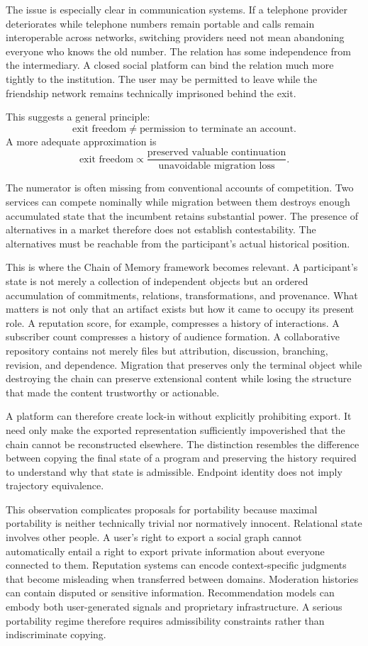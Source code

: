 \documentclass[11pt]{article}
\begin{document}
The issue is especially clear in communication systems. If a telephone provider deteriorates while telephone numbers remain portable and calls remain interoperable across networks, switching providers need not mean abandoning everyone who knows the old number. The relation has some independence from the intermediary. A closed social platform can bind the relation much more tightly to the institution. The user may be permitted to leave while the friendship network remains technically imprisoned behind the exit.

This suggests a general principle:
\[
\text{exit freedom}
\neq
\text{permission to terminate an account}.
\]
A more adequate approximation is
\[
\text{exit freedom}
\propto
\frac{\text{preserved valuable continuation}}
{\text{unavoidable migration loss}}.
\]

The numerator is often missing from conventional accounts of competition. Two services can compete nominally while migration between them destroys enough accumulated state that the incumbent retains substantial power. The presence of alternatives in a market therefore does not establish contestability. The alternatives must be reachable from the participant's actual historical position.

This is where the Chain of Memory framework becomes relevant. A participant's state is not merely a collection of independent objects but an ordered accumulation of commitments, relations, transformations, and provenance. What matters is not only that an artifact exists but how it came to occupy its present role. A reputation score, for example, compresses a history of interactions. A subscriber count compresses a history of audience formation. A collaborative repository contains not merely files but attribution, discussion, branching, revision, and dependence. Migration that preserves only the terminal object while destroying the chain can preserve extensional content while losing the structure that made the content trustworthy or actionable.

A platform can therefore create lock-in without explicitly prohibiting export. It need only make the exported representation sufficiently impoverished that the chain cannot be reconstructed elsewhere. The distinction resembles the difference between copying the final state of a program and preserving the history required to understand why that state is admissible. Endpoint identity does not imply trajectory equivalence.

This observation complicates proposals for portability because maximal portability is neither technically trivial nor normatively innocent. Relational state involves other people. A user's right to export a social graph cannot automatically entail a right to export private information about everyone connected to them. Reputation systems can encode context-specific judgments that become misleading when transferred between domains. Moderation histories can contain disputed or sensitive information. Recommendation models can embody both user-generated signals and proprietary infrastructure. A serious portability regime therefore requires admissibility constraints rather than indiscriminate copying.
\end{document}
